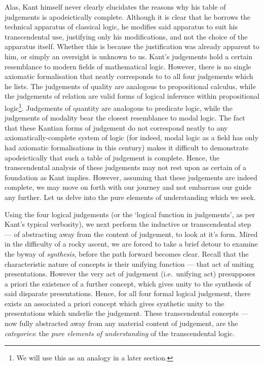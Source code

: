 \noindent
Alas, Kant himself never clearly elucidates the reasons why his table of judgements is apodeictically complete. Although it is clear that he borrows the technical apparatus of classical logic, he modifies said apparatus to suit his transcendental use, justifying only his modifications, and not the choice of the apparatus itself. Whether this is because the justification was already apparent to him, or simply an oversight is unknown to us. Kant's judgements hold a certain resemblance to modern fields of mathematical logic. However, there is no single axiomatic formalisation that neatly corresponds to to all four judgements which he lists. The judgements of quality are analogous to propositional calculus, while the judgements of relation are valid forms of logical inference within propositional logic\footnote{We will use this as an analogy in a later section.}. Judgements of quantity are analogous to predicate logic, while the judgements of modality bear the closest resemblance to modal logic. The fact that these Kantian forms of judgement do not correspond neatly to any axiomatically-complete system of logic (for indeed, modal logic as a field has only had axiomatic formalisations in this century) makes it difficult to demonstrate apodeictically that such a table of judgement is complete. Hence, the transcendental analysis of these judgements may not rest upon as certain of a foundation as Kant implies. However, assuming that these judgements are indeed complete, we may move on forth with our journey and not embarrass our guide any further. Let us delve into the pure elements of understanding which we seek.

Using the four logical judgements (or the \enquote*{logical function in judgements}, as per Kant's typical verbosity), we next perform the inductive or transcendental step --- of abstracting away from the content of judgement, to look at it's form. Mired in the difficulty of a rocky ascent, we are forced to take a brief detour to examine the byway of \emph{synthesis}, before the path forward becomes clear. Recall that the characteristic nature of concepts is their unifying function --- that act of uniting presentations. However the very act of judgement (i.e.\ unifying act) presupposes a priori the existence of a further concept, which gives unity to the synthesis of said disparate presentations. Hence, for all four formal logical judgement, there exists an associated a priori concept which gives synthetic unity to the presentations which underlie the judgement. These transcendental concepts --- now fully abstracted away from any material content of judgement, are the \emph{categories}: the \emph{pure elements of understanding} of the transcendental logic.


